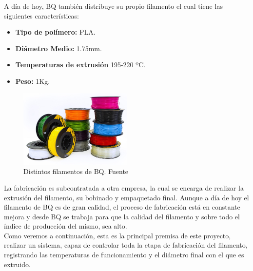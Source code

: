 A día de hoy, BQ también distribuye su propio filamento el cual tiene las siguientes características:\\
\begin{itemize}
    \item \textbf{Tipo de polímero:} PLA.
    \item \textbf{Diámetro Medio:} 1.75mm.
    \item \textbf{Temperaturas de extrusión} 195-220 ºC.
    \item \textbf{Peso:} 1Kg.
\end{itemize}
\begin{figure}[H]
        \centering
        \includegraphics[width=0.5\textwidth]{images/filamento_bq.png}
        \caption{Distintos filamentos de BQ. Fuente \cite{bq}}
        \label{fig:estado_filamento}
\end{figure}
La fabricación es subcontratada a otra empresa, la cual se encarga de realizar la extrusión del filamento, su bobinado y empaquetado final. Aunque a día de hoy el filamento de BQ es de gran calidad, el proceso de fabricación está en constante mejora y desde BQ se trabaja para que la calidad del filamento y sobre todo el índice de producción del mismo, sea alto.\\

Como veremos a continuación, esta es la principal premisa de este proyecto, realizar un sistema, capaz de controlar toda la etapa de fabricación del filamento, registrando las temperaturas de funcionamiento y el diámetro final con el que es extruido.\\




